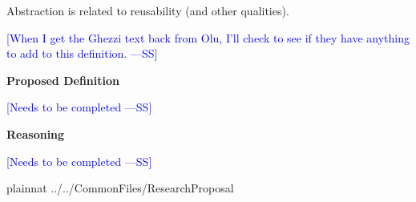 \documentclass[letterpaper,cleveref]{lipics-v2019}
\newcommand{\authornote}[3]{\textcolor{#1}{[#3 ---#2]}}
\newcommand{\authornote}[3]{}
\newcommand{\wss}[1]{\authornote{blue}{SS}{#1}} %
\theoremstyle{definition}
\begin{document}
Abstraction is related to reusability (and other qualities).

\wss{When I get the Ghezzi text back from Olu, I'll check to see if they have
  anything to add to this definition.}

\noindent \textbf{Proposed Definition} 

\wss{Needs to be completed}

\noindent \textbf{Reasoning}

\wss{Needs to be completed}

\newpage

 {plainnat}
 {../../CommonFiles/ResearchProposal}
\end{document}
